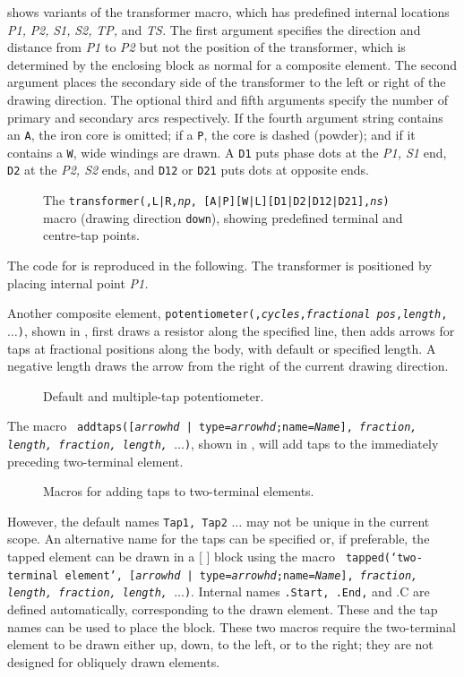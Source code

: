  shows variants of the transformer macro,
which has predefined internal locations
{\sl P1,} {\sl P2,} {\sl S1,} {\sl S2,} {\sl TP,} and {\sl TS.}
The first argument specifies the direction and distance from {\sl P1}
to {\sl P2} but not the position of the transformer, which is determined
by the enclosing block as normal for a composite element.  The second
argument places the secondary side of the transformer to the left or
right of the drawing direction.  The optional third and fifth arguments
specify the number of primary and secondary arcs respectively.  If the
fourth argument string contains an {\tt A}, the iron core is omitted;
if a {\tt P}, the core is dashed (powder); and if it contains a {\tt W},
wide windings are drawn.  A {\tt D1} puts phase dots at the {\sl P1,
S1} end, {\tt D2} at the {\sl P2, S2} ends, and {\tt D12} or {\tt D21}
puts dots at opposite ends.
\begin{figure}[H]
   
  \caption{The {\tt transformer(\linespec,L|R,{\sl np},%
[A|P][W|L][D1|D2|D12|D21],{\sl ns})}
     macro (drawing direction {\tt down}), showing predefined terminal
     and centre-tap points.}
   \label{Xform}
   \end{figure}

The code for  is reproduced in the following.
The transformer is positioned by placing internal point {\sl P1.}


Another composite element,
 {\tt potentiometer(\linespec,{\sl cycles},{\sl fractional pos},{\sl length},
    $\ldots$)},
shown in ,
first draws a resistor along the specified line, then adds arrows for taps
at fractional positions along the body, with default or specified length.
A negative length draws the arrow from the right of the current drawing
direction.
\begin{figure}[H]
   
   \caption{Default and multiple-tap potentiometer.}
   \label{Potentiometers}
   \end{figure}

The macro {\tt
    addtaps([{\sl arrowhd} | type={\sl arrowhd};name={\sl Name}],
    {\sl fraction, length, fraction, length,}
    $\ldots$)},
shown in , will add taps to the
immediately preceding two-terminal element.
\begin{figure}[H]
   
   \caption{Macros for adding taps to two-terminal elements.}
   \label{Taps}
   \end{figure}
However, the default names
{\tt Tap1, Tap2} $\ldots$ may not be unique in the current scope.  An
alternative name for the taps can be specified or, if preferable, the
tapped element can be drawn in a [ ] block using the macro {\tt
  tapped(`{\sl two-terminal element}',
  [{\sl arrowhd} | type={\sl arrowhd};name={\sl Name}],
    {\sl fraction, length, fraction, length,} $\ldots$)}.
   Internal names {\tt .Start, .End,} and {.C} are defined automatically,
   corresponding to the drawn element. These and the tap names can be used
   to place the block.
These two macros require the two-terminal element to be drawn either up,
down, to the left, or to the right; they are not designed for obliquely
drawn elements.

